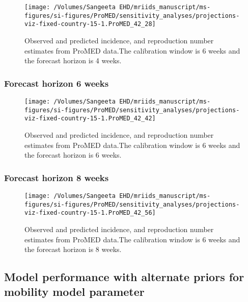 \documentclass[9pt,twoside,lineno]{pnas-new}
\begin{document}
\begin{figure}  
    \centering 
\texttt{[image: /Volumes/Sangeeta EHD/mriids\_manuscript/ms-figures/si-figures/ProMED/sensitivity\_analyses/projections-viz-fixed-country-15-1.ProMED\_42\_28]} 
  \caption{Observed and predicted incidence, and reproduction number
    estimates from ProMED data.The calibration window is 6 weeks and
    the forecast horizon is 4 weeks.}
  \label{fig:pm64ul10 }
\end{figure}\FloatBarrier


\subsubsection{Forecast horizon 6 weeks}\label{forecast-horizon-6-weeks-11}

\begin{figure}

  \centering 
\texttt{[image: /Volumes/Sangeeta EHD/mriids\_manuscript/ms-figures/si-figures/ProMED/sensitivity\_analyses/projections-viz-fixed-country-15-1.ProMED\_42\_42]} 
  \caption{Observed and predicted incidence, and reproduction number
    estimates from ProMED data.The calibration window is 6 weeks and
    the forecast horizon is 6 weeks.}
  \label{fig:pm66ul10}
\end{figure}\FloatBarrier


\subsubsection{Forecast horizon 8 weeks}\label{forecast-horizon-8-weeks-11}

\begin{figure}
    \centering
    \texttt{[image: /Volumes/Sangeeta EHD/mriids\_manuscript/ms-figures/si-figures/ProMED/sensitivity\_analyses/projections-viz-fixed-country-15-1.ProMED\_42\_56]} 
  \caption{Observed and predicted incidence, and reproduction number
    estimates from ProMED data.The calibration window is 6 weeks and
    the forecast horizon is 8 weeks.}
  \label{fig:pm68ul10}
\end{figure}\FloatBarrier


\subsection{Model performance with alternate priors for mobility
  model parameter}\label{model-performance-with-alternate-priors-for-mobility-model-parameter}
\end{document}
